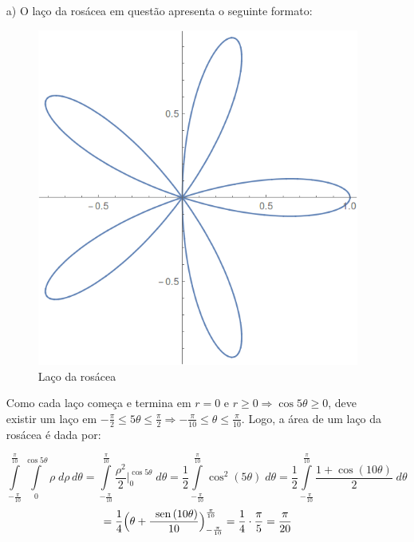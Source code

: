 \documentclass[12pt,a4paper]{article}
\newcommand{\sen}{\mbox{\, sen}\,}
\begin{document}
\begin{itemize}
    \item[a)] O laço da rosácea em questão apresenta o seguinte formato:
    

\begin{figure}[H]
	\centering
	\includegraphics[scale=0.4]{Fig1a.png}  
	\caption{Laço da rosácea}
	\label{fig:figura1a}
\end{figure}

Como cada laço começa e termina em $r=0$ e $r \geq 0 \Rightarrow \cos 5\theta \geq 0$, deve existir um laço em $-\frac{\pi}{2} \leq 5\theta \leq \frac{\pi}{2} \Rightarrow -\frac{\pi}{10} \leq \theta \leq \frac{\pi}{10}$. Logo, a área de um laço da rosácea é dada por:

$$ \int\limits_{-\frac{\pi}{10}}^{\frac{\pi}{10}} \int\limits_0^{\cos 5\theta} \rho \; d\rho \, d\theta = \int\limits_{-\frac{\pi}{10}}^{\frac{\pi}{10}} \frac{\rho^2}{2} \Big|_0^{\cos 5\theta} \; d\theta = \frac{1}{2} \int\limits_{-\frac{\pi}{10}}^{\frac{\pi}{10}} \cos^2(5\theta) \; d\theta = \frac{1}{2} \int\limits_{-\frac{\pi}{10}}^{\frac{\pi}{10}} \frac{1 + \cos (10\theta)}{2} \; d\theta $$
$$ = \frac{1}{4} \Big( \theta + \frac{\sen (10\theta)}{10} \Big)_{-\frac{\pi}{10}}^{\frac{\pi}{10}} = \frac{1}{4} \cdot \frac{\pi}{5} = \frac{\pi}{20} $$


\end{itemize}
\end{document}
